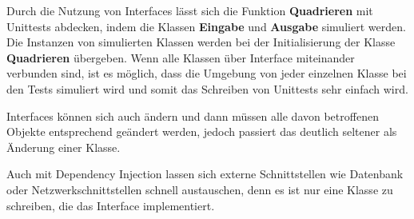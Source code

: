 Durch die Nutzung von Interfaces lässt sich 
die Funktion \textbf{Quadrieren} mit Unittests abdecken,
indem die Klassen \textbf{Eingabe} und \textbf{Ausgabe} simuliert werden.
Die Instanzen von simulierten Klassen werden bei der Initialisierung der Klasse \textbf{Quadrieren} übergeben.
Wenn alle Klassen über Interface miteinander verbunden sind, 
ist es möglich, dass die Umgebung von jeder einzelnen Klasse bei den Tests simuliert
wird und somit das Schreiben von Unittests sehr einfach wird. 

Interfaces können sich auch ändern und dann müssen alle davon betroffenen Objekte entsprechend geändert werden, 
jedoch passiert das deutlich seltener als Änderung einer Klasse.

Auch mit Dependency Injection lassen sich externe Schnittstellen wie Datenbank oder Netzwerkschnittstellen schnell austauschen, 
denn es ist nur eine Klasse zu schreiben, die das Interface implementiert.